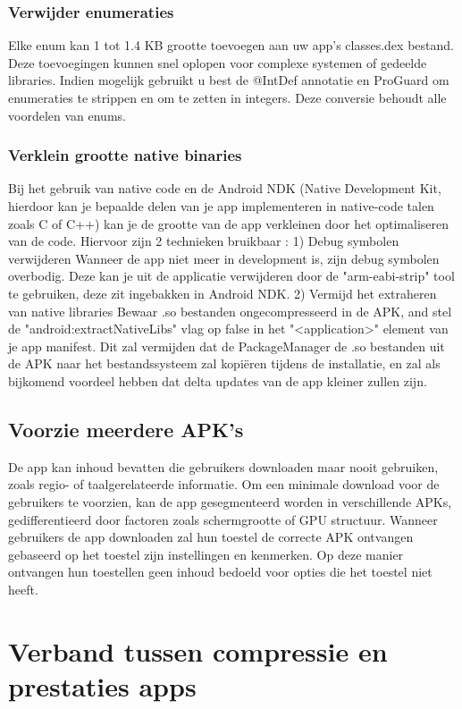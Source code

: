 \subsubsection*{Verwijder enumeraties}
\label{sec:removeenumerations}
Elke enum kan 1 tot 1.4 KB grootte toevoegen aan uw app's classes.dex bestand. Deze toevoegingen kunnen snel oplopen voor complexe systemen of gedeelde libraries. Indien mogelijk gebruikt u best de @IntDef annotatie en ProGuard om enumeraties te strippen en om te zetten in integers. Deze conversie behoudt alle voordelen van enums. 
\subsubsection*{Verklein grootte native binaries}
\label{sec:reducesizenativebinaries}
Bij het gebruik van native code en de Android NDK (Native Development Kit, hierdoor kan je bepaalde delen van je app implementeren in native-code talen zoals C of C++) kan je de grootte van de app verkleinen door het optimaliseren van de code. Hiervoor zijn 2 technieken bruikbaar :
1) Debug symbolen verwijderen
Wanneer de app niet meer in development is, zijn debug symbolen overbodig. Deze kan je uit de applicatie verwijderen door de "arm-eabi-strip" tool te gebruiken, deze zit ingebakken in Android NDK.
2) Vermijd het extraheren van native libraries
Bewaar .so bestanden ongecompresseerd in de APK, and stel de "android:extractNativeLibs" vlag op false in het "<application>" element van je app manifest. Dit zal vermijden dat de PackageManager de .so bestanden uit de APK naar het bestandssysteem zal kopiëren tijdens de installatie, en zal als bijkomend voordeel hebben dat delta updates van de app kleiner zullen zijn. 
\subsection{Voorzie meerdere APK's}
\label{sec:multipleapks}
De app kan inhoud bevatten die gebruikers downloaden maar nooit gebruiken, zoals regio- of taalgerelateerde informatie. Om een minimale download voor de gebruikers te voorzien, kan de app gesegmenteerd worden in verschillende APKs, gedifferentieerd door factoren zoals schermgrootte of GPU structuur.
Wanneer gebruikers de app downloaden zal hun toestel de correcte APK ontvangen gebaseerd op het toestel zijn instellingen en kenmerken. Op deze manier ontvangen hun toestellen geen inhoud bedoeld voor opties die het toestel niet heeft.


\section{Verband tussen compressie en prestaties apps}
\label{sec:verbandcompressieprestaties}
